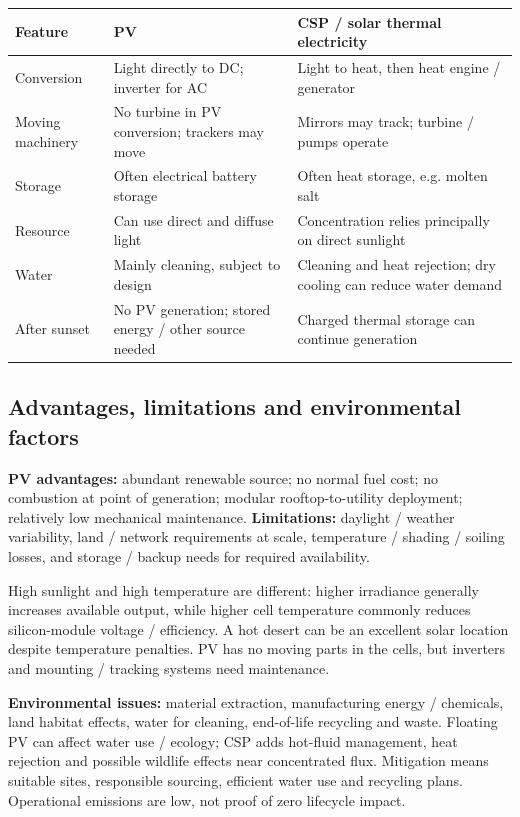 \documentclass[11pt,a4paper]{article}
\begin{document}
\begin{center}\small
\begin{tabularx}{\textwidth}{L{3cm}YY}
\toprule\textbf{Feature} & \textbf{PV} & \textbf{CSP / solar thermal electricity}\\\midrule
Conversion & Light directly to DC; inverter for AC & Light to heat, then heat engine / generator\\
Moving machinery & No turbine in PV conversion; trackers may move & Mirrors may track; turbine / pumps operate\\
Storage & Often electrical battery storage & Often heat storage, e.g. molten salt\\
Resource & Can use direct and diffuse light & Concentration relies principally on direct sunlight\\
Water & Mainly cleaning, subject to design & Cleaning and heat rejection; dry cooling can reduce water demand\\
After sunset & No PV generation; stored energy / other source needed & Charged thermal storage can continue generation\\\bottomrule
\end{tabularx}\end{center}

\subsection{Advantages, limitations and environmental factors}
\textbf{PV advantages:} abundant renewable source; no normal fuel cost; no combustion at point of generation; modular rooftop-to-utility deployment; relatively low mechanical maintenance. \textbf{Limitations:} daylight / weather variability, land / network requirements at scale, temperature / shading / soiling losses, and storage / backup needs for required availability.

High sunlight and high temperature are different: higher irradiance generally increases available output, while higher cell temperature commonly reduces silicon-module voltage / efficiency. A hot desert can be an excellent solar location despite temperature penalties. PV has no moving parts in the cells, but inverters and mounting / tracking systems need maintenance.

\textbf{Environmental issues:} material extraction, manufacturing energy / chemicals, land habitat effects, water for cleaning, end-of-life recycling and waste. Floating PV can affect water use / ecology; CSP adds hot-fluid management, heat rejection and possible wildlife effects near concentrated flux. Mitigation means suitable sites, responsible sourcing, efficient water use and recycling plans. Operational emissions are low, not proof of zero lifecycle impact.
\end{document}

